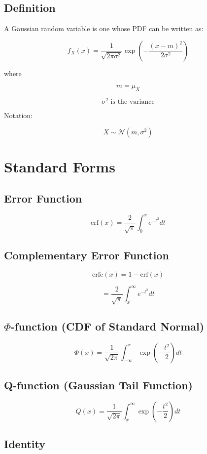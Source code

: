 \documentclass[12pt]{article}
\begin{document}
\subsection*{Definition}

A Gaussian random variable is one whose PDF can be written as:

\[
f_X(x) = \frac{1}{\sqrt{2\pi\sigma^2}} \exp\left(-\frac{(x-m)^2}{2\sigma^2}\right)
\]

where

\[
m = \mu_X
\]

\[
\sigma^2 \text{ is the variance}
\]

Notation:

\[
X \sim \mathcal{N}(m,\sigma^2)
\]

\section*{Standard Forms}

\subsection*{Error Function}

\[
\text{erf}(x) = \frac{2}{\sqrt{\pi}} \int_0^x e^{-t^2} dt
\]

\subsection*{Complementary Error Function}

\[
\text{erfc}(x) = 1 - \text{erf}(x)
\]

\[
= \frac{2}{\sqrt{\pi}} \int_x^{\infty} e^{-t^2} dt
\]

\subsection*{$\Phi$-function (CDF of Standard Normal)}

\[
\Phi(x) = \frac{1}{\sqrt{2\pi}} \int_{-\infty}^x \exp\left(-\frac{t^2}{2}\right) dt
\]

\subsection*{Q-function (Gaussian Tail Function)}

\[
Q(x) = \frac{1}{\sqrt{2\pi}} \int_x^{\infty} \exp\left(-\frac{t^2}{2}\right) dt
\]

\subsection*{Identity}
\end{document}
